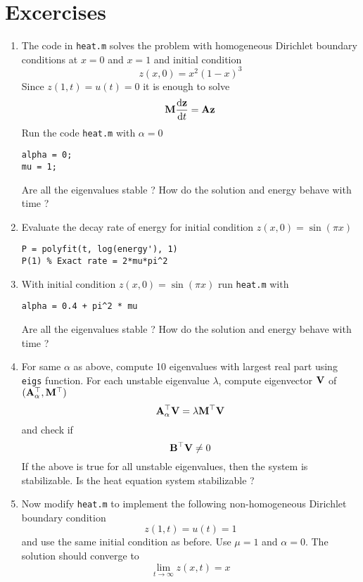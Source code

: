 \documentclass[12pt]{article}
\begin{document}
\section{Excercises}
\begin{enumerate}
\item The code in {\tt heat.m} solves the problem with homogeneous Dirichlet boundary conditions at $x=0$ and $x=1$ and initial condition
\[
z(x,0) = x^2 (1-x)^3
\]
Since $z(1,t) = u(t) = 0$ it is enough to solve
\[
{\mathbf M} \frac{\textrm{d} {\mathbf z}}{\textrm{d} t} = {\mathbf A} {\mathbf z}
\]
Run the code {\tt heat.m} with $\alpha =0$
\begin{lstlisting}
alpha = 0; 
mu = 1;
\end{lstlisting}
Are all the eigenvalues stable ? How do the solution and energy behave with time ?

\item Evaluate the decay rate of energy for initial condition $z(x,0) = \sin(\pi x)$
\begin{lstlisting}
P = polyfit(t, log(energy'), 1)
P(1) % Exact rate = 2*mu*pi^2
\end{lstlisting}
      
\item With initial condition $z(x,0) = \sin(\pi x)$ run {\tt heat.m} with
\begin{lstlisting}
alpha = 0.4 + pi^2 * mu
\end{lstlisting}
Are all the eigenvalues stable ? How do the solution and energy behave with time ?

\item For same $\alpha$ as above, compute 10 eigenvalues with largest real part using {\tt eigs} function. For each unstable eigenvalue $\lambda$, compute eigenvector ${\mathbf V}$ of $({\mathbf A}_\alpha^\top,{\mathbf M}^\top)$
\[
 {\mathbf A}_\alpha^\top {\mathbf V} = \lambda {\mathbf M}^\top {\mathbf V}
\]
and check if 
\[
 {\mathbf B}^\top {\mathbf V} \ne 0
\]
If the above is true for all unstable eigenvalues, then the system is stabilizable. Is the heat equation system stabilizable ?

\item Now modify {\tt heat.m} to implement the following non-homogeneous Dirichlet boundary condition
\[
z(1,t) = u(t) = 1
\]
and use the same initial condition as before. Use $\mu=1$ and $\alpha=0$. The solution should converge to
\[
\lim_{t \to \infty} z(x,t) = x
\]

\end{enumerate}

\end{document}
